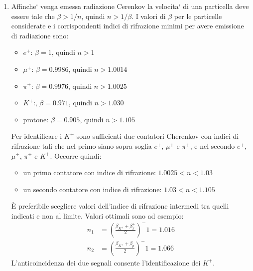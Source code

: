 \begin{Answer}
\begin{enumerate}
  \item Affinche` venga emessa radiazione Cerenkov la velocita` di una particella deve essere tale che $\beta > 1/n$, quindi $n > 1/\beta$. I valori di $\beta$ per le particelle considerate e i corrispondenti indici di rifrazione minimi per avere emissione di radiazione sono:
    \begin{itemize}
      \item $e^+$: $\beta = 1$, quindi $n >1$
      \item $\mu^+$: $\beta = 0.9986$, quindi $n >1.0014$
      \item $\pi^+$: $\beta = 0.9976$, quindi $n >1.0025$
      \item $K^+$:, $\beta = 0.971$, quindi $n >1.030$
      \item protone: $\beta = 0.905$, quindi $n >1.105$
    \end{itemize}
    Per identificare i $K^+$ sono sufficienti due contatori Cherenkov con indici di rifrazione tali che nel primo siano sopra soglia $e^+$, $\mu^+$ e $\pi^+$, e nel secondo $e^+$, $\mu^+$, $\pi^+$ e
    $K^+$. Occorre quindi:
    \begin{itemize}
    \item un primo contatore con indice di rifrazione: $1.0025 < n <1.03$
    \item un secondo contatore con indice di rifrazione: $1.03 < n <1.105$
    \end{itemize}
    \`E preferibile scegliere valori dell’indice di rifrazione intermedi tra quelli indicati e non al limite. Valori ottimali sono ad esempio:
    \begin{align*}
      n_1 &= \left(\frac{\beta_{K^+} + \beta_\pi^+}{2}\right)^-1 = 1.016 \\
      n_2 &= \left(\frac{\beta_{K^+} + \beta_p}{2}\right)^-1 = 1.066
    \end{align*}
    L’anticoincidenza dei due segnali consente l’identificazione dei $K^+$.
  \end{enumerate}
\end{Answer}

